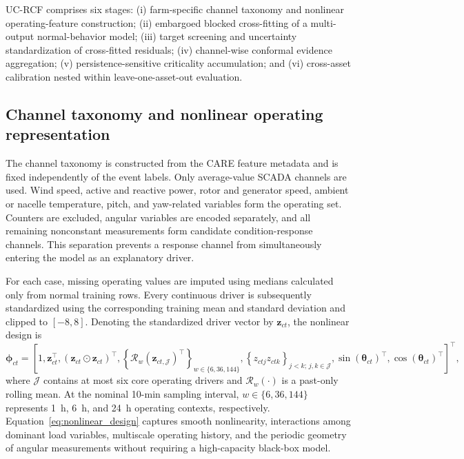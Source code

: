 UC-RCF comprises six stages: (i) farm-specific channel taxonomy and nonlinear
operating-feature construction; (ii) embargoed blocked cross-fitting of a
multi-output normal-behavior model; (iii) target screening and uncertainty
standardization of cross-fitted residuals; (iv) channel-wise conformal evidence
aggregation; (v) persistence-sensitive criticality accumulation; and (vi)
cross-asset calibration nested within leave-one-asset-out evaluation.

\subsection{Channel taxonomy and nonlinear operating representation}

The channel taxonomy is constructed from the CARE feature metadata and is
fixed independently of the event labels. Only average-value SCADA channels are
used. Wind speed, active and reactive power, rotor and generator speed,
ambient or nacelle temperature, pitch, and yaw-related variables form the
operating set. Counters are excluded, angular variables are encoded separately,
and all remaining nonconstant measurements form candidate condition-response
channels. This separation prevents a response channel from simultaneously
entering the model as an explanatory driver.

For each case, missing operating values are imputed using medians calculated
only from normal training rows. Every continuous driver is subsequently
standardized using the corresponding training mean and standard deviation and
clipped to $[-8,8]$. Denoting the standardized driver vector by
$\mathbf{z}_{ct}$, the nonlinear design is
\begin{equation}
\boldsymbol{\phi}_{ct}=
\left[
1,
\mathbf{z}_{ct}^{\top},
(\mathbf{z}_{ct}\odot\mathbf{z}_{ct})^{\top},
\left\{\mathcal{R}_{w}(\mathbf{z}_{ct,\mathcal{J}})^{\top}\right\}_{w\in\{6,36,144\}},
\left\{z_{ctj}z_{ctk}\right\}_{j<k;\,j,k\in\mathcal{J}},
\sin(\boldsymbol{\theta}_{ct})^{\top},
\cos(\boldsymbol{\theta}_{ct})^{\top}
\right]^{\top},
\label{eq:nonlinear_design}
\end{equation}
where $\mathcal{J}$ contains at most six core operating drivers and
$\mathcal{R}_{w}(\cdot)$ is a past-only rolling mean. At the nominal 10-min
sampling interval, $w\in\{6,36,144\}$ represents 1~h, 6~h, and 24~h operating
contexts, respectively. Equation~\eqref{eq:nonlinear_design} captures smooth
nonlinearity, interactions among dominant load variables, multiscale operating
history, and the periodic geometry of angular measurements without requiring a
high-capacity black-box model.

